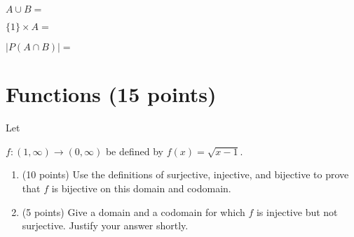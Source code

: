 \documentclass[11pt]{article}
\def\R{\mathbb{R}}
\def\Q{\mathbb{Q}}
\def\Z{\mathbb{Z}}
\def\sectionOneA#1{}
\def\sectionOneB#1{}
\def\sectionTwoA#1{#1}
\def\sectionTwoB#1{}
\def\sectionVicsection#1{}
\newcounter{pgpts}
\newcounter{cumpts}
\newcommand{\cnewpage}{\addtocounter{cumpts}{\value{pgpts}}\newpage\setcounter{pgpts}{0}}
\begin{document}
 $A\cup B =$ 
\vspace*{2cm}

\sectionOneA{$A \times \{1\} = $}
\sectionOneB{$A \times \{1\} = $} %
\sectionTwoA{$\{1\} \times A = $}
\sectionTwoB{$\{1\} \times A = $} %
\sectionVicsection{$|A \times B|=$}

\vspace*{2cm}
 
 $|P({A\cap B})| = $\\ 


\cnewpage

\section{Functions (15 points)}\addtocounter{pgpts}{15}


Let
\sectionOneA{ $f:\mathbb{R}^+\to\mathbb{R}^+$ be defined by $f(x)=\frac{1}{x^2}$\;.}
\sectionOneB{$f(x)=\frac{x-1}{2}$\;.} %
\sectionTwoA{$f:(1,\infty) \to (0,\infty)$ be defined by $f(x)=\sqrt{x-1}$\;.}
\sectionTwoB{$f(x)=2x+5$\;.} %
\sectionVicsection{$f(x)=7x-\frac{1}{2}$\;.}
  \begin{enumerate}
    \item (10 points) Use the definitions of surjective, injective, and bijective to prove that $f$ is bijective on this domain and codomain.
       \vspace*{10cm}
    \item (5 points) Give a domain and a codomain for which $f$ is injective but not surjective. Justify your answer shortly.
  \end{enumerate}



\end{document}
